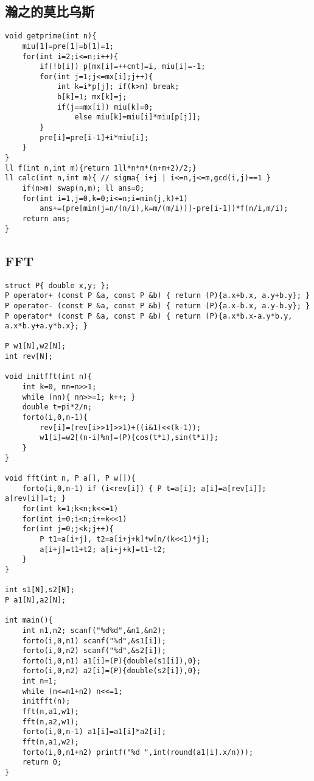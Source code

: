 \documentclass{article}
\begin{document}
\subsection{瀚之的莫比乌斯}
\begin{lstlisting}
void getprime(int n){
	miu[1]=pre[1]=b[1]=1;
	for(int i=2;i<=n;i++){
		if(!b[i]) p[mx[i]=++cnt]=i, miu[i]=-1;
		for(int j=1;j<=mx[i];j++){
			int k=i*p[j]; if(k>n) break;
			b[k]=1; mx[k]=j;
			if(j==mx[i]) miu[k]=0;
				else miu[k]=miu[i]*miu[p[j]];
		}
		pre[i]=pre[i-1]+i*miu[i];
	}
}
ll f(int n,int m){return 1ll*n*m*(n+m+2)/2;} 
ll calc(int n,int m){ // sigma{ i+j | i<=n,j<=m,gcd(i,j)==1 }
	if(n>m) swap(n,m); ll ans=0;
	for(int i=1,j=0,k=0;i<=n;i=min(j,k)+1)
		ans+=(pre[min(j=n/(n/i),k=m/(m/i))]-pre[i-1])*f(n/i,m/i);
	return ans;
}
\end{lstlisting}

\subsection{FFT}
\begin{lstlisting}
struct P{ double x,y; };
P operator+ (const P &a, const P &b) { return (P){a.x+b.x, a.y+b.y}; }
P operator- (const P &a, const P &b) { return (P){a.x-b.x, a.y-b.y}; }
P operator* (const P &a, const P &b) { return (P){a.x*b.x-a.y*b.y, a.x*b.y+a.y*b.x}; }

P w1[N],w2[N];
int rev[N];

void initfft(int n){
	int k=0, nn=n>>1;
	while (nn){ nn>>=1; k++; }
	double t=pi*2/n;
	forto(i,0,n-1){
		rev[i]=(rev[i>>1]>>1)+((i&1)<<(k-1));
		w1[i]=w2[(n-i)%n]=(P){cos(t*i),sin(t*i)};
	}
}

void fft(int n, P a[], P w[]){
	forto(i,0,n-1) if (i<rev[i]) { P t=a[i]; a[i]=a[rev[i]]; a[rev[i]]=t; }
	for(int k=1;k<n;k<<=1)
	for(int i=0;i<n;i+=k<<1)
	for(int j=0;j<k;j++){
		P t1=a[i+j], t2=a[i+j+k]*w[n/(k<<1)*j];
		a[i+j]=t1+t2; a[i+j+k]=t1-t2;
	}
}

int s1[N],s2[N];
P a1[N],a2[N];

int main(){
	int n1,n2; scanf("%d%d",&n1,&n2);
	forto(i,0,n1) scanf("%d",&s1[i]);
	forto(i,0,n2) scanf("%d",&s2[i]);
	forto(i,0,n1) a1[i]=(P){double(s1[i]),0};
	forto(i,0,n2) a2[i]=(P){double(s2[i]),0};
	int n=1;
	while (n<=n1+n2) n<<=1;
	initfft(n);
	fft(n,a1,w1);
	fft(n,a2,w1);
	forto(i,0,n-1) a1[i]=a1[i]*a2[i];
	fft(n,a1,w2);
	forto(i,0,n1+n2) printf("%d ",int(round(a1[i].x/n)));
	return 0;
}
\end{lstlisting}
\end{document}
